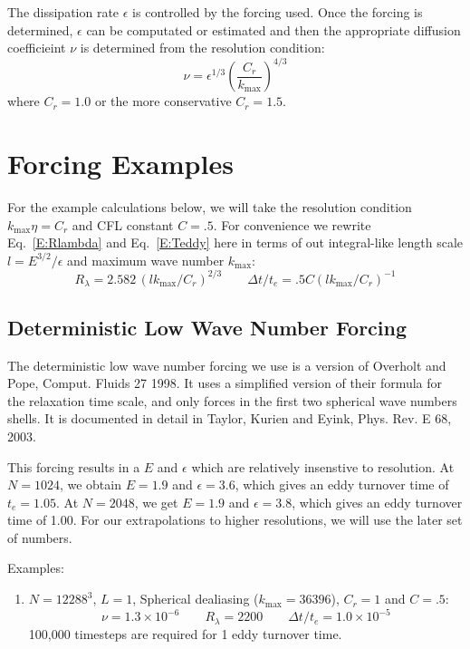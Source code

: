 \documentclass[12pt]{article}
\begin{document}
The dissipation rate $\epsilon$ is controlled by the forcing used.
Once the forcing is determined, $\epsilon$ can be computated or
estimated and then the appropriate diffusion coefficieint $\nu$ is
determined from the resolution condition:
\[
 \nu = \epsilon^{1/3} \left( \frac{C_r}{k_\text{max}} \right)^{4/3}
\]
where $C_r=1.0$ or the more conservative $C_r=1.5$. 


\section{Forcing Examples}

For the example calculations below, we will take the resolution condition
$ k_\text{max} \eta = C_r $ and CFL constant $C=.5$.  
For convenience we rewrite Eq.~\ref{E:Rlambda} and Eq.~\ref{E:Teddy} here 
in terms of out integral-like length scale $l=E^{3/2}/ \epsilon$ and
maximum wave number $k_\text{max}$:
\[
R_\lambda =   2.582 \,  (l k_\text{max}/C_r)^{2/3}
\qquad
\Delta t / t_e  =   .5 C   (l k_\text{max}/C_r)^{-1} 
\]


\subsection{Deterministic Low Wave Number Forcing}

The deterministic low wave number forcing we use is a version
of Overholt and Pope, Comput. Fluids 27 1998.  It uses a simplified
version of their formula for the relaxation time scale, and only forces
in the first two spherical wave numbers shells.
It is documented in detail in Taylor, Kurien and Eyink, Phys. Rev. E 68, 2003. 

This forcing results in a $E$ and $\epsilon$ which are relatively
insenstive to resolution.  At $N=1024$, we obtain 
$E=1.9$ and $\epsilon=3.6$, which gives
an eddy turnover time of $t_e = 1.05$.
At $N=2048$, we get $E=1.9$ and $\epsilon=3.8$, which gives
an eddy turnover time of 1.00.  For our extrapolations to higher resolutions, 
we will use the later set of numbers.  


Examples:
\begin{enumerate}
\item $N=12288^3$, $L=1$, Spherical dealiasing ($k_\text{max} = 36396$), 
$C_r=1$ and $C=.5$:
\[
\nu = 1.3 \times 10^{-6} \qquad  R_\lambda =  2200 \qquad \Delta t / t_e = 1.0\times10^{-5}
\]
100,000 timesteps are required for 1 eddy turnover time.  



\end{enumerate}
\end{document}
